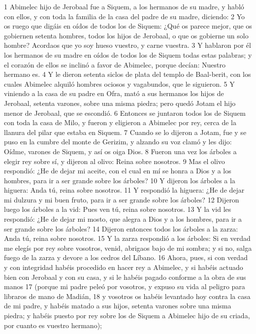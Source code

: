 1 Abimelec hijo de Jerobaal fue a Siquem, a los hermanos de su madre, y habló con ellos, y con toda la familia de la casa del padre de su madre, diciendo:
2 Yo os ruego que digáis en oídos de todos los de Siquem: ¿Qué os parece mejor, que os gobiernen setenta hombres, todos los hijos de Jerobaal, o que os gobierne un solo hombre? Acordaos que yo soy hueso vuestro, y carne vuestra.
3 Y hablaron por él los hermanos de su madre en oídos de todos los de Siquem todas estas palabras; y el corazón de ellos se inclinó a favor de Abimelec, porque decían: Nuestro hermano es.
4 Y le dieron setenta siclos de plata   del templo de Baal-berit, con los cuales Abimelec alquiló hombres ociosos y vagabundos, que le siguieron.
5 Y viniendo a la casa de su padre en Ofra, mató a sus hermanos los hijos de Jerobaal, setenta varones, sobre una misma piedra; pero quedó Jotam el hijo menor de Jerobaal, que se escondió.
6 Entonces se juntaron todos los de Siquem con toda la casa de Milo, y fueron y eligieron a Abimelec por rey, cerca de la llanura del pilar que estaba en Siquem.
7 Cuando se lo dijeron a Jotam, fue y se puso en la cumbre del monte de Gerizim, y alzando su voz clamó y les dijo: Oídme, varones de Siquem, y así os oiga Dios.
8 Fueron una vez los árboles a elegir rey sobre sí, y dijeron al olivo: Reina sobre nosotros.
9 Mas el olivo respondió: ¿He de dejar mi aceite, con el cual en mí se honra a Dios y a los hombres, para ir a ser grande sobre los árboles?
10 Y dijeron los árboles a la higuera: Anda tú, reina sobre nosotros.
11 Y respondió la higuera: ¿He de dejar mi dulzura y mi buen fruto, para ir a ser grande sobre los árboles?
12 Dijeron luego los árboles a la vid: Pues ven tú, reina sobre nosotros.
13 Y la vid les respondió: ¿He de dejar mi mosto, que alegra a Dios y a los hombres, para ir a ser grande sobre los árboles?
14 Dijeron entonces todos los árboles a la zarza: Anda tú, reina sobre nosotros.
15 Y la zarza respondió a los árboles: Si en verdad me elegís por rey sobre vosotros, venid, abrigaos bajo de mi sombra; y si no, salga fuego de la zarza y devore a los cedros del Líbano.
16 Ahora, pues, si con verdad y con integridad habéis procedido en hacer rey a Abimelec, y si habéis actuado bien con Jerobaal y con su casa, y si le habéis pagado conforme a la obra de sus manos
17 (porque mi padre peleó por vosotros, y expuso su vida al peligro para libraros de mano de Madián,
18 y vosotros os habéis levantado hoy contra la casa de mi padre, y habéis matado a sus hijos, setenta varones sobre una misma piedra; y habéis puesto por rey sobre los de Siquem a Abimelec hijo de su criada, por cuanto es vuestro hermano);
